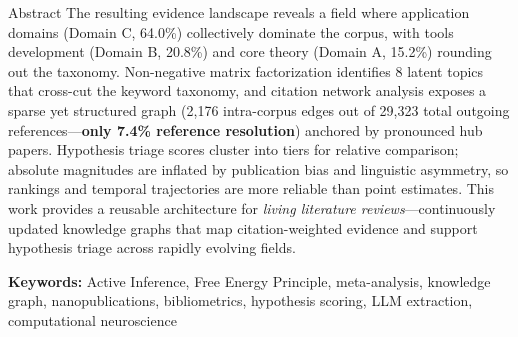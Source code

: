\documentclass[
  ignorenonframetext,
]{beamer}
\begin{document}
\begin{frame}[allowframebreaks]{Abstract}
The resulting evidence landscape reveals a field where application
domains (Domain C, 64.0\%) collectively dominate the corpus, with tools
development (Domain B, 20.8\%) and core theory (Domain A, 15.2\%)
rounding out the taxonomy. Non-negative matrix factorization identifies
8 latent topics that cross-cut the keyword taxonomy, and citation
network analysis exposes a sparse yet structured graph (2,176
intra-corpus edges out of 29,323 total outgoing
references---\textbf{only 7.4\% reference resolution}) anchored by
pronounced hub papers. Hypothesis triage scores cluster into tiers for
relative comparison; absolute magnitudes are inflated by publication
bias and linguistic asymmetry, so rankings and temporal trajectories are
more reliable than point estimates. This work provides a reusable
architecture for \emph{living literature reviews}---continuously updated
knowledge graphs that map citation-weighted evidence and support
hypothesis triage across rapidly evolving fields.

\textbf{Keywords:} Active Inference, Free Energy Principle,
meta-analysis, knowledge graph, nanopublications, bibliometrics,
hypothesis scoring, LLM extraction, computational neuroscience
\end{frame}
\end{document}
